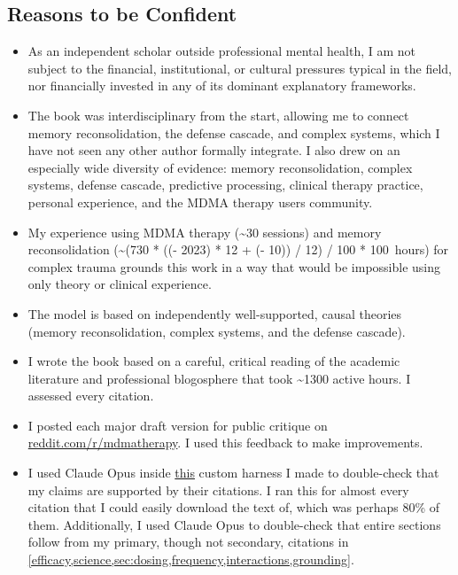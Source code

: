\documentclass[11pt,oneside]{book}
\newcommand{\reconsolidationhours}{\the\numexpr (730 * ((\year - 2023) * 12 + (\month - 10)) / 12) / 100 * 100 \relax{}}
\begin{document}
\subsection*{Reasons to be Confident}
\begin{itemize}
    \item As an independent scholar outside professional mental health, I am not subject to the financial, institutional, or cultural pressures typical in the field, nor financially invested in any of its dominant explanatory frameworks.
    \item The book was interdisciplinary from the start, allowing me to connect memory reconsolidation, the defense cascade, and complex systems, which I have not seen any other author formally integrate. I also drew on an especially wide diversity of evidence: memory reconsolidation, complex systems, defense cascade, predictive processing, clinical therapy practice, personal experience, and the MDMA therapy users community.
    \item My experience using MDMA therapy (\textasciitilde30 sessions) and memory reconsolidation (\textasciitilde\reconsolidationhours{}\,hours) for complex trauma grounds this work in a way that would be impossible using only theory or clinical experience.
    \item The model is based on independently well-supported, causal theories (memory reconsolidation, complex systems, and the defense cascade).
    \item I wrote the book based on a careful, critical reading of the academic literature and professional blogosphere that took \textasciitilde1300 active hours. I assessed every citation.
    \item I posted each major draft version for public critique on \href{www.reddit.com/r/mdmatherapy}{reddit.com/r/mdmatherapy}. I used this feedback to make improvements.
    \item I used Claude Opus inside \href{https://github.com/groeneveld/latex_claim_verifier}{this} custom harness I made to double-check that my claims are supported by their citations. I ran this for almost every citation that I could easily download the text of, which was perhaps 80\% of them. Additionally, I used Claude Opus to double-check that entire sections follow from my primary, though not secondary, citations in \cref{efficacy,science,sec:dosing,frequency,interactions,grounding}.
\end{itemize}
\end{document}
